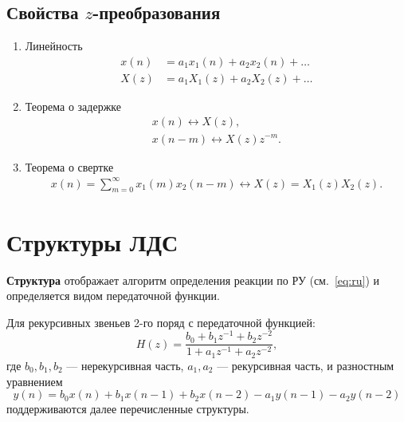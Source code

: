 \documentclass[a4paper, 14pt]{extarticle}
\begin{document}
\subsection{Свойства $z$-преобразования}
\begin{enumerate}
    \item Линейность
        \begin{equation}
            \begin{split}
                x(n) &= a_1 x_1(n) + a_2 x_2(n) + \ldots\\
                X(z) &= a_1 X_1(z) + a_2 X_2(z) + \ldots
            \end{split}
        \end{equation}
    \item Теорема о задержке
        \begin{equation}
            \begin{split}
                x(n) \leftrightarrow X(z),\\
                x(n-m) \leftrightarrow X(z) z^{-m}.
            \end{split}
        \end{equation}
    \item Теорема о свертке
        \begin{equation}
            \begin{split}
                x(n) = \sum^{\infty}_{m=0} x_1(m) x_2(n-m) \leftrightarrow X(z) = X_1(z) X_2(z).
            \end{split}
        \end{equation}
\end{enumerate}

\section{Структуры ЛДС}
\textbf{Структура} отображает алгоритм определения реакции по РУ (см.~\ref{eq:ru}) и определяется видом передаточной функции.

Для рекурсивных звеньев 2-го поряд с передаточной функцией:
\begin{equation}
    H(z) = \frac{b_0 + b_1 z^{-1} + b_2 z^{-2}}{1 + a_1 z^{-1} + a_2 z^{-2}},
\end{equation}
где $b_0, b_1, b_2$ --- нерекурсивная часть, $a_1, a_2$ --- рекурсивная часть,
и разностным уравнением
\begin{equation}
    y(n) = b_0 x(n) + b_1 x(n-1) + b_2 x(n-2) - a_1 y(n-1) - a_2 y(n-2)
\end{equation}
поддерживаются далее перечисленные структуры.
\end{document}
